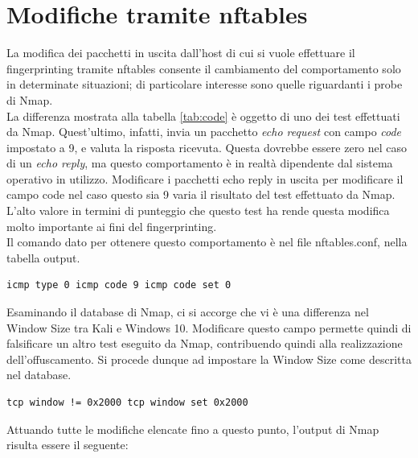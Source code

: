 \section{Modifiche tramite nftables}
La modifica dei pacchetti in uscita dall'host di cui si vuole effettuare il fingerprinting tramite nftables consente il cambiamento del comportamento solo in determinate situazioni; di particolare interesse sono quelle riguardanti i probe di Nmap.
\\
La differenza mostrata alla tabella \ref{tab:code} è oggetto di uno dei test effettuati da Nmap. Quest'ultimo, infatti, invia un pacchetto \textit{echo request} con campo \textit{code} impostato a 9, e valuta la risposta ricevuta.
Questa dovrebbe essere zero nel caso di un \textit{echo reply}, ma questo comportamento è in realtà dipendente dal sistema operativo in utilizzo.
Modificare i pacchetti echo reply in uscita per modificare il campo code nel caso questo sia 9 varia il risultato del test effettuato da Nmap. L'alto valore in termini di punteggio che questo test ha rende questa modifica molto importante ai fini del fingerprinting.\\
Il comando dato per ottenere questo comportamento è nel file nftables.conf, nella tabella output.

\begin{lstlisting}[caption={Modifica del campo code in caso di test Nmap}, label=codice_icmp]
	icmp type 0 icmp code 9 icmp code set 0
\end{lstlisting}

Esaminando il database di Nmap, ci si accorge che vi è una differenza nel Window Size tra Kali e Windows 10. Modificare questo campo permette quindi di falsificare un altro test eseguito da Nmap, contribuendo quindi alla realizzazione dell'offuscamento.
Si procede dunque ad impostare la Window Size come descritta nel database.

\begin{lstlisting}[caption={Modifica della Window Size}, caption=listingsize]
	tcp window != 0x2000 tcp window set 0x2000
\end{lstlisting}

Attuando tutte le modifiche elencate fino a questo punto, l'output di Nmap risulta essere il seguente:

